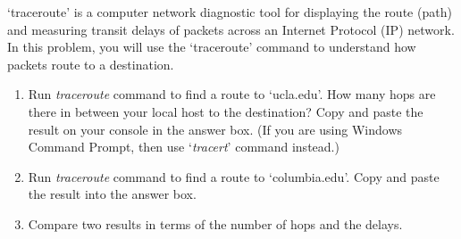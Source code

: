 \documentclass{report}
\begin{document}
\mktitle

\begin{problem}
`traceroute' is a computer network diagnostic tool for displaying the route (path) and measuring transit delays of packets across an Internet Protocol (IP) network. In this problem, you will use the `traceroute' command to understand how packets route to a destination.

\begin{enumerate}
\item Run \textit{traceroute} command to find a route to `ucla.edu'. How many hops are there in between your local host to the destination? Copy and paste the result on your console in the answer box. (If you are using Windows Command Prompt, then use `\textit{tracert}' command instead.)
\item Run \textit{traceroute} command to find a route to `columbia.edu'. Copy and paste the result into the answer box.
\item Compare two results in terms of the number of hops and the delays.
\end{enumerate}


\end{problem}
\end{document}
